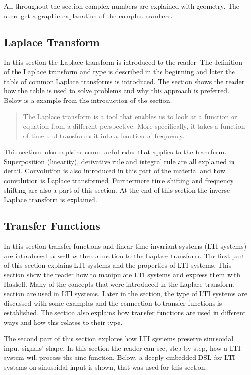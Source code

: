 All throughout the section complex numbers are explained with geometry. The users get a graphic explanation of the complex numbers.\fi

\subsection{Laplace Transform}
In this section the Laplace transform is introduced to the reader. The definition of the Laplace transform and type is described in the beginning and later the table of common Laplace transforms is introduced. The section shows the reader how the table is used to solve problems and why this approach is preferred. Below is a example from the introduction of the section.

\blockquote{The Laplace transform is a tool that enables us to look at a function or equation from a different perspective. More specifically, it takes a function of time and transforms it into a function of frequency.}

This sections also explains some useful rules that applies to the transform. Superposition (linearity), derivative rule and integral rule are all explained in detail. Convolution is also introduced in this part of the material and how convolution is Laplace transformed. Furthermore time shifting and frequency shifting are also a part of this section. At the end of this section the inverse Laplace transform is explained.

\subsection{Transfer Functions}
In this section transfer functions and linear time-invariant systems (LTI systems) are introduced as well as the connection to the Laplace transform. The first part of this section explains LTI systems and the properties of LTI systems. This section show the reader how to manipulate LTI systems and express them with Haskell. Many of the concepts that were introduced in the Laplace transform section are used in LTI systems. Later in the section, the type of LTI systems are discussed with some examples and the connection to transfer functions is established. The section also explains how transfer functions are used in different ways and how this relates to their type.

The second part of this section explores how LTI systems preserve sinusoidal input signals' shape. In this section the reader can see, step by step, how a LTI system will process the sine function. Below, a deeply embedded DSL for LTI systems on sinusoidal input is shown, that was used for this section.

